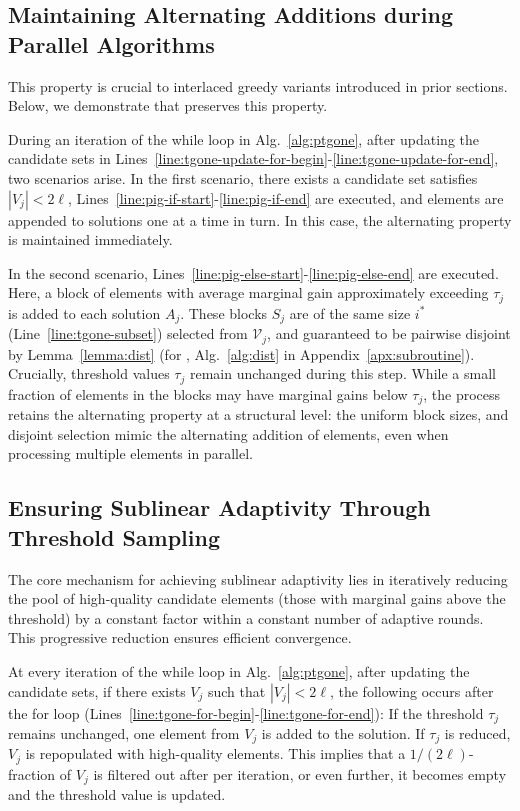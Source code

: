 \subsection{Maintaining Alternating Additions during Parallel Algorithms}
\label{sec:ptg-alter}
This property is crucial to interlaced greedy variants 
introduced in prior sections. 
Below, we demonstrate that \ptgoneshort preserves this property.

During an iteration of the while loop in Alg.~\ref{alg:ptgone},
after updating the candidate sets in Lines~\ref{line:tgone-update-for-begin}-\ref{line:tgone-update-for-end},
two scenarios arise. 
In the first scenario, there exists a candidate set satisfies $|V_j| < 2\ell$,
Lines~\ref{line:pig-if-start}-\ref{line:pig-if-end} are executed,
and elements are appended to solutions one at a time in turn.
In this case, the alternating property is maintained immediately.

In the second scenario, Lines~\ref{line:pig-else-start}-\ref{line:pig-else-end} are executed.
Here, a block of elements with average marginal gain approximately exceeding $\tau_j$
is added to each solution $A_j$.
These blocks $S_j$ are of the same size $i^*$ (Line~\ref{line:tgone-subset})
selected from $\mathcal V_j$,
and guaranteed to be pairwise disjoint by 
Lemma~\ref{lemma:dist} (for \dist, Alg.~\ref{alg:dist} in Appendix~\ref{apx:subroutine}).
Crucially, threshold values $\tau_j$ 
remain unchanged during this step.
While a small fraction of elements in the blocks may have marginal gains below $\tau_j$,
the process retains the alternating property at a structural level: 
the uniform block sizes, and disjoint selection mimic the alternating addition of elements, even when processing multiple elements in parallel.

\subsection{Ensuring Sublinear Adaptivity Through Threshold Sampling}
The core mechanism for achieving sublinear adaptivity 
lies in iteratively reducing the pool of high-quality candidate elements 
(those with marginal gains above the threshold) 
by a constant factor within a constant number of adaptive rounds. 
This progressive reduction ensures efficient convergence.

At every iteration of the while loop in Alg.~\ref{alg:ptgone}, 
after updating the candidate sets,
if there exists $V_j$ such that $|V_j| < 2\ell$,
the following occurs after the for loop
(Lines~\ref{line:tgone-for-begin}-\ref{line:tgone-for-end}):
If the threshold $\tau_j$ remains unchanged,
one element from $V_j$ is added to the solution.
If $\tau_j$ is reduced,
$V_j$ is repopulated with high-quality elements.
This implies that a $1/(2\ell)$-fraction of $V_j$ is filtered out
after per iteration,
or even further, it becomes empty and
the threshold value is updated.

